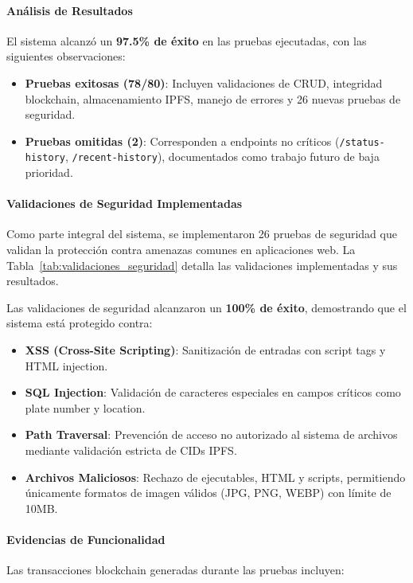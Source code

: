 \paragraph{Análisis de Resultados}
El sistema alcanzó un \textbf{97.5\% de éxito} en las pruebas ejecutadas, con las siguientes observaciones:

\begin{itemize}
    \item \textbf{Pruebas exitosas (78/80)}: Incluyen validaciones de CRUD, integridad blockchain, almacenamiento IPFS, manejo de errores y 26 nuevas pruebas de seguridad.
    \item \textbf{Pruebas omitidas (2)}: Corresponden a endpoints no críticos (\texttt{/status-history}, \texttt{/recent-history}), documentados como trabajo futuro de baja prioridad.
\end{itemize}

\paragraph{Validaciones de Seguridad Implementadas}
Como parte integral del sistema, se implementaron 26 pruebas de seguridad que validan la protección contra amenazas comunes en aplicaciones web. La Tabla~\ref{tab:validaciones_seguridad} detalla las validaciones implementadas y sus resultados.



Las validaciones de seguridad alcanzaron un \textbf{100\% de éxito}, demostrando que el sistema está protegido contra:

\begin{itemize}
    \item \textbf{XSS (Cross-Site Scripting)}: Sanitización de entradas con script tags y HTML injection.
    \item \textbf{SQL Injection}: Validación de caracteres especiales en campos críticos como plate number y location.
    \item \textbf{Path Traversal}: Prevención de acceso no autorizado al sistema de archivos mediante validación estricta de CIDs IPFS.
    \item \textbf{Archivos Maliciosos}: Rechazo de ejecutables, HTML y scripts, permitiendo únicamente formatos de imagen válidos (JPG, PNG, WEBP) con límite de 10MB.
\end{itemize}

\paragraph{Evidencias de Funcionalidad}
Las transacciones blockchain generadas durante las pruebas incluyen:

